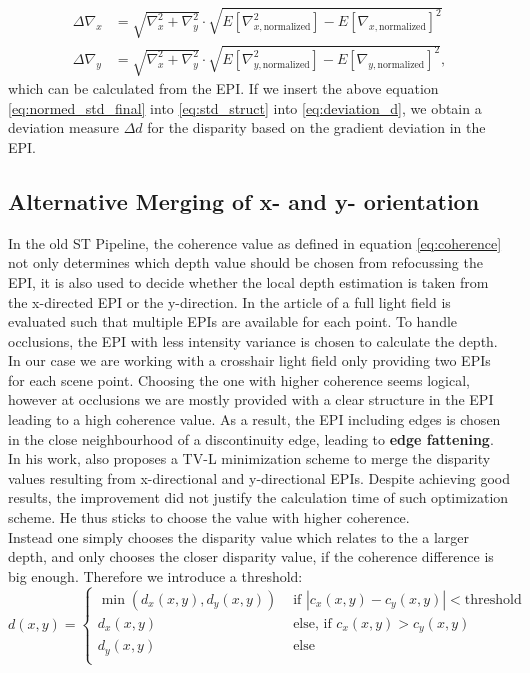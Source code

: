 \documentclass  [
  paper    = a4,
  BCOR     = 10mm,
  twoside,
  fontsize = 12pt,
  fleqn,
  toc      = bibnumbered,
  toc      = listofnumbered,
  numbers  = noendperiod,
  headings = normal,
  listof   = leveldown,
  version  = 3.03
]                                       {scrreprt}
\begin{document}
 \begin{align}\label{eq:normed_std_final}
 \Delta\nabla_{x} &=  \sqrt{\nabla_x^2 + \nabla_y^2} \cdot \sqrt{E[\nabla_{x, \text{normalized}}^2] - E[\nabla_{x, \text{normalized}}]^2}\\
 \Delta\nabla_{y} &= \sqrt{\nabla_x^2 + \nabla_y^2} \cdot \sqrt{E[\nabla_{y, \text{normalized}}^2] - E[\nabla_{y, \text{normalized}}]^2},
 \end{align}
 which can be calculated from the EPI.
 If we insert the above equation \ref{eq:normed_std_final} into \ref{eq:std_struct} into \ref{eq:deviation_d}, we obtain a deviation measure $\Delta d$ for the disparity based on the gradient deviation in the EPI.
 
 \subsection{Alternative Merging of x- and y- orientation}
 In the old ST Pipeline, the coherence value as defined in equation \ref{eq:coherence} not only determines which depth value should be chosen from refocussing the EPI, it is also used to decide whether the local depth estimation is taken from the x-directed EPI or the y-direction. In the article of \cite{sheng2018occlusion} a full light field is evaluated such that multiple EPIs are available for each point. To handle occlusions, the EPI with less intensity variance is chosen to calculate the depth. In our case we are working with a crosshair light field only providing two EPIs for each scene point. Choosing the one with higher coherence seems logical, however at occlusions we are mostly provided with a clear structure in the EPI leading to a high coherence value. As a result, the EPI including edges is chosen in the close neighbourhood of a discontinuity edge, leading to \textbf{edge fattening}.\\
 In his work, \cite{wanner2014orientation} also proposes a TV-L minimization scheme to merge the disparity values resulting from x-directional and y-directional EPIs. Despite achieving good results, the improvement did not justify the calculation time of such optimization scheme. He thus sticks to choose the value with higher coherence.\\
 Instead one simply chooses the disparity value which relates to the a larger depth, and only chooses the closer disparity value, if the coherence difference is big enough. Therefore we introduce a threshold:
 \begin{equation}\label{eq:altmerging}
 d(x,y) = \begin{cases}
 \min(d_x(x,y),d_y(x,y))&\text{ if } |c_x(x,y)-c_y(x,y)|<\text{threshold} \\
  d_x(x,y)&\text{ else, if } c_x(x,y)> c_y(x,y)\\
  d_y(x,y)&\text{ else}\\
  \end{cases}
   \end{equation}
\end{document}
